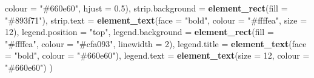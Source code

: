 \documentclass[
]{article}
\newenvironment{Shaded}{\begin{snugshade}}{\end{snugshade}}
\newcommand{\AttributeTok}[1]{\textcolor[rgb]{0.13,0.29,0.53}{#1}}
\newcommand{\DecValTok}[1]{\textcolor[rgb]{0.00,0.00,0.81}{#1}}
\newcommand{\FloatTok}[1]{\textcolor[rgb]{0.00,0.00,0.81}{#1}}
\newcommand{\FunctionTok}[1]{\textcolor[rgb]{0.13,0.29,0.53}{\textbf{#1}}}
\newcommand{\NormalTok}[1]{#1}
\newcommand{\StringTok}[1]{\textcolor[rgb]{0.31,0.60,0.02}{#1}}
\begin{document}
\begin{Shaded}
\begin{Highlighting}[]
                               \AttributeTok{colour =} \StringTok{"\#660e60"}\NormalTok{, }\AttributeTok{hjust =} \FloatTok{0.5}\NormalTok{),}
  \AttributeTok{strip.background =} \FunctionTok{element\_rect}\NormalTok{(}\AttributeTok{fill =} \StringTok{"\#893f71"}\NormalTok{),}
  \AttributeTok{strip.text =} \FunctionTok{element\_text}\NormalTok{(}\AttributeTok{face =} \StringTok{"bold"}\NormalTok{, }\AttributeTok{colour =} \StringTok{"\#ffffea"}\NormalTok{, }\AttributeTok{size =} \DecValTok{12}\NormalTok{),}
  \AttributeTok{legend.position =} \StringTok{"top"}\NormalTok{,}
  \AttributeTok{legend.background =} \FunctionTok{element\_rect}\NormalTok{(}\AttributeTok{fill =} \StringTok{"\#ffffea"}\NormalTok{, }\AttributeTok{colour =} \StringTok{"\#cfa093"}\NormalTok{,}
                                   \AttributeTok{linewidth =} \DecValTok{2}\NormalTok{),}
  \AttributeTok{legend.title =} \FunctionTok{element\_text}\NormalTok{(}\AttributeTok{face =} \StringTok{"bold"}\NormalTok{, }\AttributeTok{colour =} \StringTok{"\#660e60"}\NormalTok{),}
  \AttributeTok{legend.text =} \FunctionTok{element\_text}\NormalTok{(}\AttributeTok{size =} \DecValTok{12}\NormalTok{, }\AttributeTok{colour =} \StringTok{"\#660e60"}\NormalTok{)}
\NormalTok{)}


\end{Highlighting}
\end{Shaded}
\end{document}
